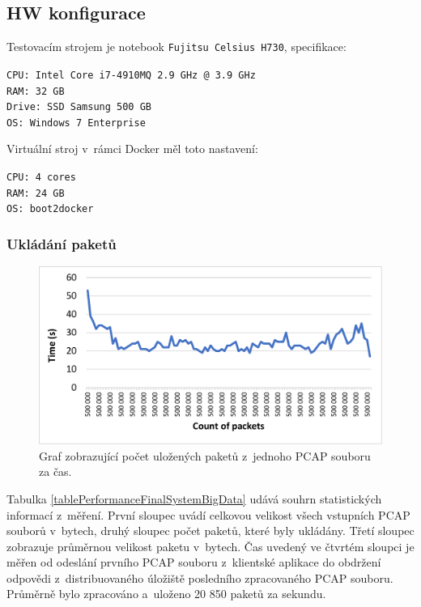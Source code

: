 \subsection{HW konfigurace}
Testovacím strojem je notebook \texttt{Fujitsu Celsius H730}, specifikace:

\vspace{0.5cm}
\noindent \texttt{CPU: Intel Core i7-4910MQ 2.9 GHz @ 3.9 GHz} \\
\texttt{RAM: 32 GB} \\
\texttt{Drive: SSD Samsung 500 GB} \\
\texttt{OS: Windows 7 Enterprise}

\vspace{0.5cm}
\noindent Virtuální stroj v~rámci Docker měl toto nastavení:

\vspace{0.5cm}
\noindent \texttt{CPU: 4 cores} \\
\texttt{RAM: 24 GB} \\
\texttt{OS: boot2docker}

\subsubsection{Ukládání paketů}

\begin{figure}[!h]
    \centering
    \includegraphics[width=15cm]{template-fig/PerformanceChartFinalBigData.pdf}
    \caption{Graf zobrazující počet uložených paketů z~jednoho PCAP souboru za čas.}
    \label{FIG_PerformanceChartFinalBigData}
\end{figure}

\noindent Tabulka \ref{tablePerformanceFinalSystemBigData} udává souhrn statistických informací z~měření. První sloupec uvádí celkovou velikost všech vstupních PCAP souborů v~bytech, druhý sloupec počet paketů, které byly ukládány. Třetí sloupec zobrazuje průměrnou velikost paketu v~bytech. Čas uvedený ve čtvrtém sloupci je měřen od odeslání prvního PCAP souboru z~klientské aplikace do obdržení odpovědi z~distribuovaného úložiště posledního zpracovaného PCAP souboru. Průměrně bylo zpracováno a~uloženo 20 850 paketů za sekundu.

